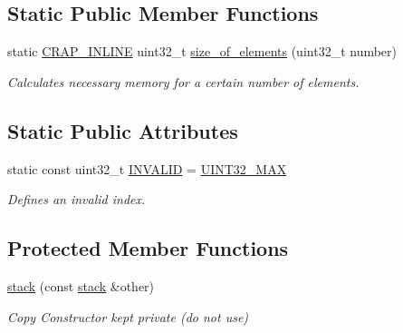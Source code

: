 \subsection*{Static Public Member Functions}
\begin{DoxyCompactItemize}
\item 
static \hyperlink{config__x86_8h_a5a40526b8d842e7ff731509998bb0f1c}{C\+R\+A\+P\+\_\+\+I\+N\+L\+I\+N\+E} uint32\+\_\+t \hyperlink{classcrap_1_1stack_ae00be9fb97a381c4763c24917262b051}{size\+\_\+of\+\_\+elements} (uint32\+\_\+t number)
\begin{DoxyCompactList}\small\item\em Calculates necessary memory for a certain number of elements. \end{DoxyCompactList}\end{DoxyCompactItemize}
\subsection*{Static Public Attributes}
\begin{DoxyCompactItemize}
\item 
static const uint32\+\_\+t \hyperlink{classcrap_1_1stack_a35cffde292cd6f37a07a5dc5fceed1bf}{I\+N\+V\+A\+L\+I\+D} = \hyperlink{crap__types_8h_ab5eb23180f7cc12b7d6c04a8ec067fdd}{U\+I\+N\+T32\+\_\+\+M\+A\+X}
\begin{DoxyCompactList}\small\item\em Defines an invalid index. \end{DoxyCompactList}\end{DoxyCompactItemize}
\subsection*{Protected Member Functions}
\begin{DoxyCompactItemize}
\item 
\hyperlink{classcrap_1_1stack_affcc0c25120a3269346eb6aa153884dd}{stack} (const \hyperlink{classcrap_1_1stack}{stack} \&other)
\begin{DoxyCompactList}\small\item\em Copy Constructor kept private (do not use) \end{DoxyCompactList}\end{DoxyCompactItemize}
